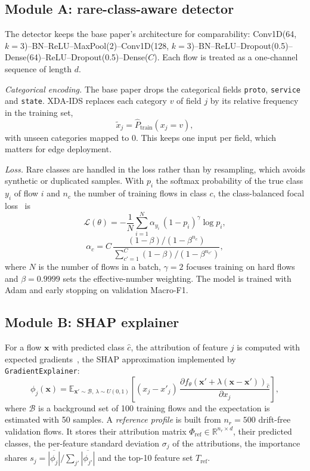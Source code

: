 \documentclass[conference]{IEEEtran}
\begin{document}
\subsection{Module A: rare-class-aware detector}
The detector keeps the base paper's architecture for comparability: Conv1D(64, $k{=}3$)--BN--ReLU--MaxPool(2)--Conv1D(128, $k{=}3$)--BN--ReLU--Dropout(0.5)--Dense(64)--ReLU--Dropout(0.5)--Dense($C$). Each flow is treated as a one-channel sequence of length $d$.

\textit{Categorical encoding.} The base paper drops the categorical fields \texttt{proto}, \texttt{service} and \texttt{state}. XDA-IDS replaces each category $v$ of field $j$ by its relative frequency in the training set,
\begin{equation}
\tilde{x}_j = \hat{P}_{\text{train}}(x_j = v),
\end{equation}
with unseen categories mapped to 0. This keeps one input per field, which matters for edge deployment.

\textit{Loss.} Rare classes are handled in the loss rather than by resampling, which avoids synthetic or duplicated samples. With $p_{i}$ the softmax probability of the true class $y_i$ of flow $i$ and $n_c$ the number of training flows in class $c$, the class-balanced focal loss~\cite{lin2017,cui2019} is
\begin{equation}
\mathcal{L}(\theta) = -\frac{1}{N}\sum_{i=1}^{N} \alpha_{y_i}\,(1-p_{i})^{\gamma}\log p_{i},
\end{equation}
\begin{equation}
\alpha_c = C\,\frac{(1-\beta)/(1-\beta^{n_c})}{\sum_{c'=1}^{C}(1-\beta)/(1-\beta^{n_{c'}})},
\end{equation}
where $N$ is the number of flows in a batch, $\gamma=2$ focuses training on hard flows and $\beta=0.9999$ sets the effective-number weighting. The model is trained with Adam and early stopping on validation Macro-F1.

\subsection{Module B: SHAP explainer}
For a flow $\mathbf{x}$ with predicted class $\hat{c}$, the attribution of feature $j$ is computed with expected gradients~\cite{erion2021}, the SHAP approximation implemented by \texttt{GradientExplainer}:
\begin{equation}
\phi_j(\mathbf{x}) = \mathbb{E}_{\mathbf{x}'\sim\mathcal{B},\,\lambda\sim U(0,1)}\!\left[(x_j-x'_j)\,\frac{\partial f_\theta(\mathbf{x}'+\lambda(\mathbf{x}-\mathbf{x}'))_{\hat{c}}}{\partial x_j}\right],
\end{equation}
where $\mathcal{B}$ is a background set of 100 training flows and the expectation is estimated with 50 samples. A \textit{reference profile} is built from $n_r=500$ drift-free validation flows. It stores their attribution matrix $\Phi_{\text{ref}}\in\mathbb{R}^{n_r\times d}$, their predicted classes, the per-feature standard deviation $\sigma_j$ of the attributions, the importance shares $s_j=\overline{|\phi_j|}/\sum_{j'}\overline{|\phi_{j'}|}$ and the top-10 feature set $T_{\text{ref}}$.
\end{document}
